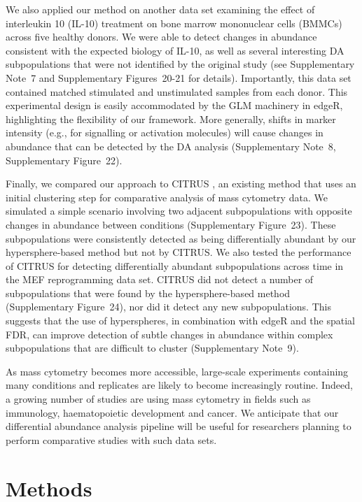 \documentclass{article}
\newcommand{\suppsecbmmc}{7}
\newcommand{\suppsecsignal}{8}
\newcommand{\suppsecclust}{9}
\newcommand{\suppfigbmmc}{20}
\newcommand{\suppfigbmmcmark}{21}
\newcommand{\suppfigshiftsim}{22}
\newcommand{\suppfigclustersim}{23}
\newcommand{\suppfigclusterreal}{24}
\begin{document}
We also applied our method on another data set \cite{levine2015datadriven} examining the effect of interleukin 10 (IL-10) treatment on bone marrow mononuclear cells (BMMCs) across five healthy donors.
We were able to detect changes in abundance consistent with the expected biology of IL-10, as well as several interesting DA subpopulations that were not identified by the original study (see Supplementary Note~\suppsecbmmc{} and Supplementary Figures~\suppfigbmmc{}-\suppfigbmmcmark{} for details).
Importantly, this data set contained matched stimulated and unstimulated samples from each donor.
This experimental design is easily accommodated by the GLM machinery in edgeR, highlighting the flexibility of our framework.
More generally, shifts in marker intensity (e.g., for signalling or activation molecules) will cause changes in abundance that can be detected by the DA analysis (Supplementary Note~\suppsecsignal{}, Supplementary Figure~\suppfigshiftsim{}).

Finally, we compared our approach to CITRUS \cite{bruggner2014automated}, an existing method that uses an initial clustering step for comparative analysis of mass cytometry data.
We simulated a simple scenario involving two adjacent subpopulations with opposite changes in abundance between conditions (Supplementary Figure~\suppfigclustersim{}).
These subpopulations were consistently detected as being differentially abundant by our hypersphere-based method but not by CITRUS.
We also tested the performance of CITRUS for detecting differentially abundant subpopulations across time in the MEF reprogramming data set.
CITRUS did not detect a number of subpopulations that were found by the hypersphere-based method (Supplementary Figure~\suppfigclusterreal{}), nor did it detect any new subpopulations.
This suggests that the use of hyperspheres, in combination with edgeR and the spatial FDR, can improve detection of subtle changes in abundance within complex subpopulations that are difficult to cluster (Supplementary Note~\suppsecclust{}).

As mass cytometry becomes more accessible, large-scale experiments containing many conditions and replicates are likely to become increasingly routine.
Indeed, a growing number of studies are using mass cytometry in fields such as immunology, haematopoietic development and cancer.
We anticipate that our differential abundance analysis pipeline will be useful for researchers planning to perform comparative studies with such data sets.

\section{Methods}
\end{document}
